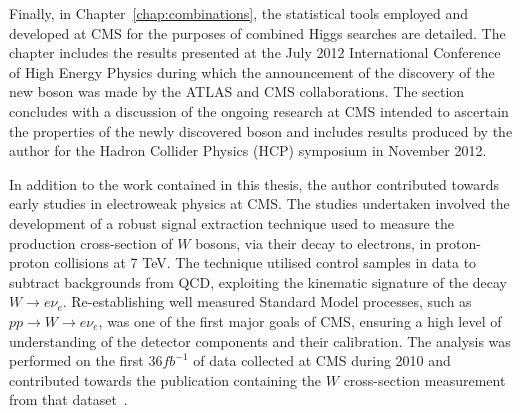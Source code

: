Finally, in Chapter~\ref{chap:combinations}, the statistical tools employed and developed
at CMS for the purposes of combined Higgs searches are detailed. The chapter includes 
the results presented at the July 2012 International Conference of High Energy Physics during which 
the announcement of the discovery of the new boson was made by the ATLAS and CMS collaborations.
The section concludes with a discussion of the ongoing research at CMS intended to ascertain the properties of 
the newly discovered boson and includes results produced by the author for the Hadron Collider Physics (HCP)
symposium in November 2012.  

In addition to the work contained in this thesis, the author contributed towards early studies
in electroweak physics at CMS. The studies undertaken involved the development of a 
robust signal extraction technique used to measure the production cross-section of $W$ bosons,
via their decay to electrons, in proton-proton collisions at 7 TeV. 
The technique utilised control samples in data to subtract backgrounds from QCD, exploiting the kinematic
signature of the decay $W\rightarrow e\nu_{e}$. 
Re-establishing well measured Standard Model processes, such as $pp\rightarrow W\rightarrow e\nu_{e}$,
was one of the first major goals of CMS, ensuring a high level of understanding of the detector components
and their calibration. The analysis was performed on the first 36$fb^{-1}$ of 
data collected at CMS during 2010 and contributed towards the publication containing the $W$ cross-section
measurement from that dataset~\citep{EWK-11-001}.  


